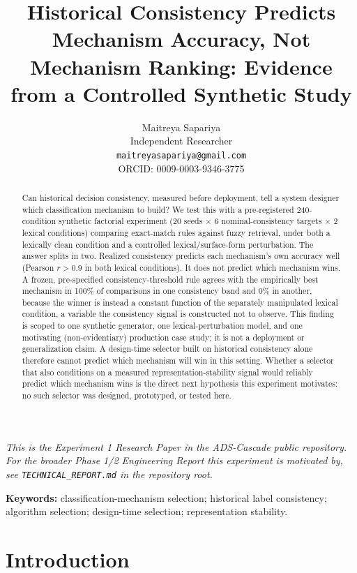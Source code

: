\documentclass[11pt]{article}
\title{Historical Consistency Predicts Mechanism Accuracy, Not Mechanism
Ranking: Evidence from a Controlled Synthetic Study}
\author{Maitreya Sapariya \\ \small Independent Researcher \\ \small \texttt{maitreyasapariya@gmail.com} \\ \small ORCID: 0009-0003-9346-3775}
\date{}
\begin{document}
\maketitle

\begin{center}
\footnotesize\textit{This is the Experiment 1 Research Paper in the ADS-Cascade public
repository. For the broader Phase 1/2 Engineering Report this experiment is motivated by, see
\texttt{TECHNICAL\_REPORT.md} in the repository root.}
\end{center}

\begin{abstract}
Can historical decision consistency, measured before deployment, tell a
system designer which classification mechanism to build? We test this with a
pre-registered 240-condition synthetic factorial experiment (20 seeds $\times$ 6 nominal-consistency
targets $\times$ 2 lexical conditions) comparing exact-match rules against
fuzzy retrieval, under both a lexically clean condition and a controlled
lexical/surface-form perturbation. The answer splits in two.
Realized consistency predicts each mechanism's own accuracy well (Pearson
$r>0.9$ in both lexical conditions). It does not predict which mechanism
wins. A frozen, pre-specified consistency-threshold rule agrees with the
empirically best mechanism in 100\% of comparisons in one consistency band
and 0\% in another, because the winner is instead a constant function of the
separately manipulated lexical condition, a variable the consistency signal
is constructed not to observe.
This finding is scoped to one synthetic generator, one lexical-perturbation
model, and one motivating (non-evidentiary) production case study; it is not
a deployment or generalization claim. A design-time selector built on historical
consistency alone therefore cannot predict which mechanism will win in this
setting. Whether a selector that also conditions on a measured
representation-stability signal would reliably predict which mechanism wins
is the direct next hypothesis this experiment motivates: no such selector was
designed, prototyped, or tested here.
\end{abstract}

\noindent\textbf{Keywords:} classification-mechanism selection; historical
label consistency; algorithm selection; design-time selection;
representation stability.

\section{Introduction}
\label{sec:introduction}
\end{document}

